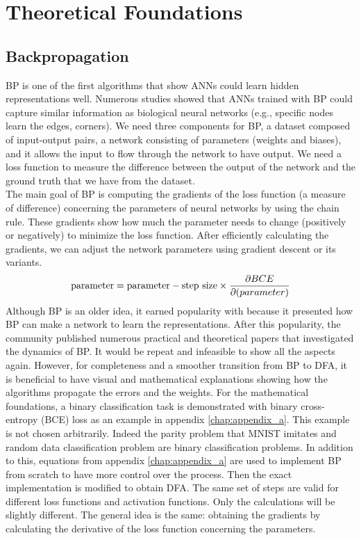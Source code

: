 \documentclass[a4paper, nobind]{templates/ociamthesis}
\begin{document}
\hypertarget{chap:chapter_1}{%
\chapter{Theoretical Foundations}\label{chap:chapter_1}}

\minitoc 

\hypertarget{backpropagation}{%
\section{Backpropagation}\label{backpropagation}}

BP is one of the first algorithms that show ANNs could learn hidden representations well. Numerous studies showed that ANNs trained with BP could capture similar information as biological neural networks (e.g., specific nodes learn the edges, corners). We need three components for BP, a dataset composed of input-output pairs, a network consisting of parameters (weights and biases), and it allows the input to flow through the network to have output. We need a loss function to measure the difference between the output of the network and the ground truth that we have from the dataset.\\
The main goal of BP is computing the gradients of the loss function (a measure of difference) concerning the parameters of neural networks by using the chain rule. These gradients show how much the parameter needs to change (positively or negatively) to minimize the loss function. After efficiently calculating the gradients, we can adjust the network parameters using gradient descent or its variants.
\[
\begin{aligned} 
\text{parameter} &= \text{parameter} - \text{step size} \times \frac{\partial BCE}{\partial \text(parameter)}  \\
\end{aligned}
\]
\noindent Although BP is an older idea, it earned popularity with \cite{Rumelhart:1986we} because it presented how BP can make a network to learn the representations. After this popularity, the community published numerous practical and theoretical papers that investigated the dynamics of BP. It would be repeat and infeasible to show all the aspects again. However, for completeness and a smoother transition from BP to DFA, it is beneficial to have visual and mathematical explanations showing how the algorithms propagate the errors and the weights. For the mathematical foundations, a binary classification task is demonstrated with binary cross-entropy (BCE) loss as an example in appendix \ref{chap:appendix_a}. This example is not chosen arbitrarily. Indeed the parity problem that MNIST imitates and random data classification problem are binary classification problems. In addition to this, equations from appendix \ref{chap:appendix_a} are used to implement BP from scratch to have more control over the process. Then the exact implementation is modified to obtain DFA. The same set of steps are valid for different loss functions and activation functions. Only the calculations will be slightly different. The general idea is the same: obtaining the gradients by calculating the derivative of the loss function concerning the parameters.
\end{document}
